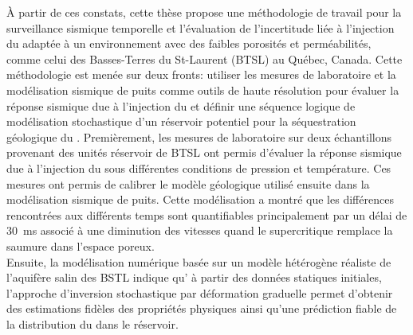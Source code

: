 À partir de ces constats, cette thèse propose une méthodologie de travail pour
la surveillance sismique temporelle et l’évaluation de l'incertitude liée à
l'injection du  adaptée à un environnement avec des faibles porosités et
perméabilités, comme celui des Basses-Terres du St-Laurent (BTSL) au Québec,
Canada. Cette
méthodologie est menée sur deux fronts: utiliser les mesures de laboratoire et
la modélisation sismique de puits comme outils de haute résolution pour évaluer la
réponse sismique due à l'injection du  et définir une séquence logique
de
modélisation stochastique d'un réservoir potentiel pour la séquestration
géologique du . Premièrement, les mesures de laboratoire sur deux
échantillons provenant des unités réservoir de BTSL ont permis d'évaluer la
réponse sismique due à l'injection du  sous différentes conditions de
pression et température. Ces mesures ont permis de calibrer le modèle géologique
utilisé ensuite dans la modélisation sismique de puits. Cette modélisation a
montré que les différences rencontrées aux différents temps sont quantifiables
principalement par un délai de \SI{30}{\milli\second} associé à une diminution
des vitesses quand le  supercritique remplace la saumure dans l’espace
poreux.\\
Ensuite, la modélisation numérique basée sur un modèle hétérogène réaliste de
l’aquifère salin des BSTL indique qu' à partir des données statiques initiales,
l'approche d'inversion stochastique par déformation graduelle permet
d'obtenir des estimations fidèles des propriétés physiques ainsi qu’une prédiction fiable
de la distribution du  dans le réservoir.

